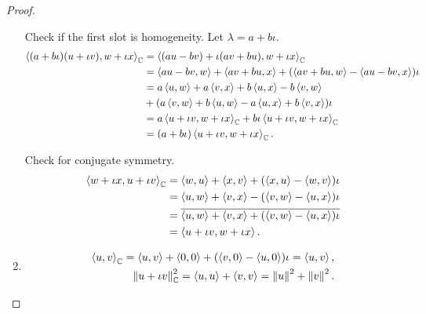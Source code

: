 \begin{proof}
\begin{enumerate}[label={(\alph*)}]
              Check if the first slot is homogeneity. Let $\lambda = a + b\iota$.
              \begin{align*}
                  \left\langle{(a + b\iota)(u  + \iota v), w + \iota x}\right\rangle_{\mathbb{C}} & = \left\langle{(au - bv) + \iota (av + bu), w + \iota x}\right\rangle_{\mathbb{C}}                                            \\
                                                                                   & = \left\langle{au - bv, w}\right\rangle + \left\langle{av + bu, x}\right\rangle + (\left\langle{av + bu, w}\right\rangle - \left\langle{au - bv, x}\right\rangle)\iota     \\
                                                                                   & = a\left\langle{u, w}\right\rangle + a\left\langle{v, x}\right\rangle + b\left\langle{u, x}\right\rangle - b\left\langle{v, w}\right\rangle                                \\
                                                                                   & + (a\left\langle{v, w}\right\rangle + b\left\langle{u, w}\right\rangle - a\left\langle{u, x}\right\rangle + b\left\langle{v, x}\right\rangle)\iota                         \\
                                                                                   & = a\left\langle{u + \iota v, w + \iota x}\right\rangle_{\mathbb{C}} + b\iota\left\langle{u + \iota v, w + \iota x}\right\rangle_{\mathbb{C}} \\
                                                                                   & = (a + b\iota)\left\langle{u + \iota v, w + \iota x}\right\rangle_{\mathbb{C}}.
              \end{align*}

              Check for conjugate symmetry.
              \begin{align*}
                  \left\langle{w + \iota x, u + \iota v}\right\rangle_{\mathbb{C}} & = \left\langle{w, u}\right\rangle + \left\langle{x, v}\right\rangle + (\left\langle{x, u}\right\rangle - \left\langle{w, v}\right\rangle)\iota        \\
                                                                    & = \left\langle{u, w}\right\rangle + \left\langle{v, x}\right\rangle - (\left\langle{v, w}\right\rangle - \left\langle{u, x}\right\rangle)\iota        \\
                                                                    & = \overline{\left\langle{u, w}\right\rangle + \left\langle{v, x}\right\rangle + (\left\langle{v, w}\right\rangle - \left\langle{u, x}\right\rangle)\iota} \\
                                                                    & = \left\langle{u + \iota v, w + \iota x}\right\rangle.
              \end{align*}
        \item \[
                  \begin{split}
                      \left\langle{u, v}\right\rangle_{\mathbb{C}} = \left\langle{u, v}\right\rangle + \left\langle{0, 0}\right\rangle + (\left\langle{v, 0}\right\rangle - \left\langle{u, 0}\right\rangle)\iota = \left\langle{u, v}\right\rangle, \\
                      \left\Vert{u + \iota v}\right\Vert_{\mathbb{C}}^{2} = \left\langle{u, u}\right\rangle + \left\langle{v, v}\right\rangle = \left\Vert{u}\right\Vert^{2} + \left\Vert{v}\right\Vert^{2}.
                  \end{split}
              \]
    \end{enumerate}
\end{proof}
\newpage

